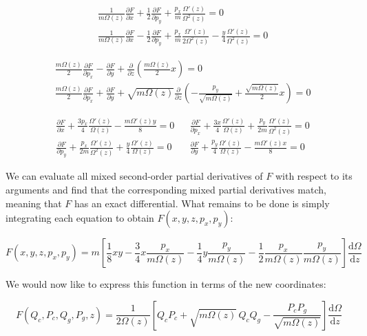 \begin{align*}
    &\frac{1}{m\Omega(z)}\frac{\partial F}{\partial x}+\frac{1}{2}\frac{\partial F}{\partial p_y}+\frac{p_x}{m}\frac{\Omega'(z)}{\Omega^2(z)}=0\\
    &\frac{1}{m\Omega(z)}\frac{\partial F}{\partial x}-\frac{1}{2}\frac{\partial F}{\partial p_y}+\frac{p_x}{m}\frac{\Omega'(z)}{2\Omega^{2}(z)}-\frac{y}{4}\frac{\Omega'(z)}{\Omega^2(z)}=0
\end{align*}

\begin{align*}
    &\frac{m\Omega(z)}{2}\frac{\partial F}{\partial p_x}-\frac{\partial F}{\partial y}+\frac{\partial}{\partial z}\left(\frac{m\Omega(z)}{2}x\right)=0\\
    &\frac{m\Omega(z)}{2}\frac{\partial F}{\partial p_x}+\frac{\partial F}{\partial y}+\sqrt{m\Omega(z)}\frac{\partial}{\partial z}\left(-\frac{p_y}{\sqrt{m\Omega(z)}}+\frac{\sqrt{m\Omega(z)}}{2}x\right)=0
\end{align*}

\fi

\begin{align*}
    &\frac{\partial F}{\partial x}+\frac{3p_x}{4}\frac{\Omega'(z)}{\Omega(z)}-\frac{m\Omega'(z)y}{8}=0 & &\frac{\partial F}{\partial p_x}+\frac{3x}{4}\frac{\Omega'(z)}{\Omega(z)}+\frac{p_y}{2m}\frac{\Omega'(z)}{\Omega^2(z)}=0\\
    &\frac{\partial F}{\partial p_y}+\frac{p_x}{2m}\frac{\Omega'(z)}{\Omega^2(z)}+\frac{y}{4}\frac{\Omega'(z)}{\Omega(z)}=0 & &\frac{\partial F}{\partial y}+\frac{p_y}{4}\frac{\Omega'(z)}{\Omega(z)}-\frac{m\Omega'(z)x}{8}=0
\end{align*}

We can evaluate all mixed second-order partial derivatives of $F$ with respect to its arguments and find that the corresponding mixed partial derivatives match, meaning that $F$ has an exact differential. What remains to be done is simply integrating each equation to obtain $F(x,y,z,p_x,p_y)$:

\begin{equation*}
    F(x,y,z,p_x,p_y)=m\left[\frac{1}{8}{xy}-\frac{3}{4}x\frac{p_x}{m\Omega(z)}-\frac{1}{4}y\frac{p_y}{m\Omega(z)}-\frac{1}{2}\frac{p_x}{m\Omega(z)}\frac{p_y}{m\Omega(z)}\right]\frac{\mathrm{d}\Omega}{\mathrm{d}z}
\end{equation*}

We would now like to express this function in terms of the new coordinates:

\begin{equation}
    F(Q_c,P_c,Q_g,P_g,z)=\frac{1}{2\Omega(z)}\left[Q_cP_c+\sqrt{m\Omega(z)}\,Q_cQ_g-\frac{P_cP_g}{\sqrt{m\Omega(z)}}\right]\frac{\mathrm{d}\Omega}{\mathrm{d}z}
\end{equation}

